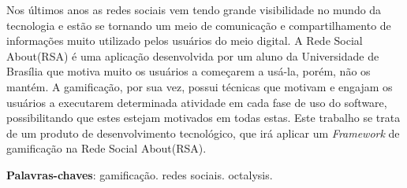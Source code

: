 \begin{resumo}
    Nos últimos anos as redes sociais vem tendo grande visibilidade no
    mundo da tecnologia e estão se tornando um meio de comunicação e
    compartilhamento de informações muito utilizado pelos usuários do
    meio digital. A Rede Social About(RSA) é uma aplicação desenvolvida
    por um aluno da Universidade de Brasília que motiva muito os usuários
    a começarem a usá-la, porém, não os mantém.
    A gamificação, por sua vez, possui técnicas que motivam e engajam
    os usuários a executarem determinada atividade em cada fase de uso do software,
    possibilitando que estes estejam motivados em todas estas.
    Este trabalho se trata de um produto
    de desenvolvimento tecnológico, que irá aplicar um \textit{Framework}
    de gamificação na Rede Social About(RSA).


    \vspace{\onelineskip}

    \noindent
    \textbf{Palavras-chaves}: gamificação. redes sociais. octalysis.
\end{resumo}
